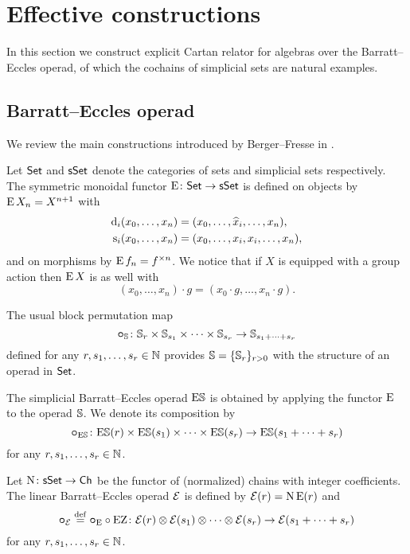 
\section{Effective constructions}

In this section we construct explicit Cartan relator for algebras over the Barratt--Eccles operad, of which the cochains of simplicial sets are natural examples.

\subsection{Barratt--Eccles operad}

We review the main constructions introduced by Berger--Fresse in \cite{berger2004combinatorial}.

Let $\mathsf{Set}$ and $\mathsf{sSet}$ denote the categories of sets and simplicial sets respectively.
The symmetric monoidal functor $\operatorname{E} \colon \mathsf{Set} \to \mathsf{sSet}$ is defined on objects by $\operatorname{E} X_n = X^{n+1}$ with
\[
\begin{split}
	\operatorname{d}_i(x_0,\dots,x_n) &= (x_0,\dots,\widehat{x}_i,\dots,x_n), \\
	\operatorname{s}_i(x_0,\dots,x_n) &= (x_0, \dots, x_i, x_i, \dots, x_n),
\end{split}
\]
and on morphisms by $\operatorname{E} f_n = f^{\times n}$.
We notice that if $X$ is equipped with a group action then $\operatorname{E} X$ is as well with
\[
(x_0,\dots,x_n) \cdot g = (x_0 \cdot g, \dots, x_n \cdot g).
\]

The usual block permutation map
\[
\bm{\circ}_{\mathbb{S}} \colon \mathbb{S}_r \times \mathbb{S}_{s_1} \times \cdots \times \mathbb{S}_{s_r} \to \mathbb{S}_{s_1+\dots+s_r}
\]
defined for any $r,s_1,\dots,s_r \in \mathbb{N}$ provides $\mathbb{S} = \{\mathbb{S}_r\}_{r>0}$ with the structure of an operad in $\mathsf{Set}$.

The simplicial Barratt--Eccles operad $\mathrm{E}\mathbb{S}$ is obtained by applying the functor $\operatorname{E}$ to the operad $\mathbb{S}$.
We denote its composition by
\[
\bm{\circ}_{\mathrm{E}\mathbb{S}} \colon \mathrm{E}\mathbb{S}(r) \times \mathrm{E}\mathbb{S}(s_1) \times\dots\times \mathrm{E}\mathbb{S}(s_r) \to \mathrm{E}\mathbb{S}(s_1+\dots+s_r)
\]
for any $r,s_1,\dots,s_r \in \mathbb{N}$.

Let $\operatorname{N} \colon \mathsf{sSet} \to \mathsf{Ch}$ be the functor of (normalized) chains with integer coefficients.
The linear Barratt--Eccles operad $\mathcal{E}$ is defined by $\mathcal{E}(r) = \operatorname{N}\operatorname{E}(r)$ and
\[
\bm{\circ}_{\mathcal{E}} \stackrel{\mathrm{def}}{=} \bm{\circ}_{\operatorname{E}} \circ \operatorname{EZ} \colon \mathcal{E}(r) \otimes \mathcal{E}(s_1) \otimes\dotsb\otimes \mathcal{E}(s_r) \to \mathcal{E}(s_1+\dots+s_r)
\]
for any $r,s_1,\dots,s_r \in \mathbb{N}$.

